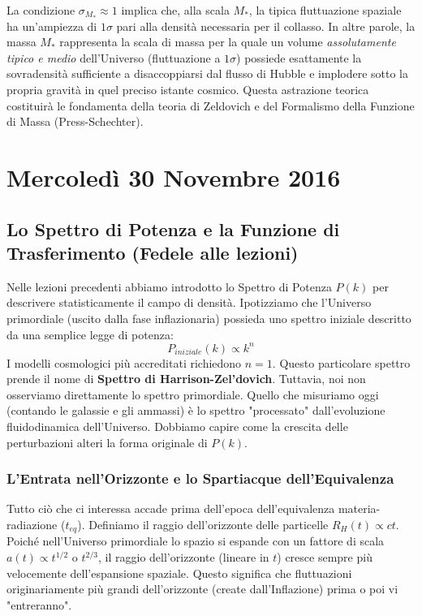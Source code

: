 \documentclass[11pt,a4paper]{report}
\begin{document}
La condizione $\sigma_{M_*} \approx 1$ implica che, alla scala $M_*$, la tipica fluttuazione spaziale ha un'ampiezza di $1 \sigma$ pari alla densità necessaria per il collasso. 
In altre parole, la massa $M_*$ rappresenta la scala di massa per la quale un volume \textit{assolutamente tipico e medio} dell'Universo (fluttuazione a $1 \sigma$) possiede esattamente la sovradensità sufficiente a disaccoppiarsi dal flusso di Hubble e implodere sotto la propria gravità in quel preciso istante cosmico. Questa astrazione teorica costituirà le fondamenta della teoria di Zeldovich e del Formalismo della Funzione di Massa (Press-Schechter).

\chapter{Mercoledì 30 Novembre 2016}

\section{Lo Spettro di Potenza e la Funzione di Trasferimento (Fedele alle lezioni)}

Nelle lezioni precedenti abbiamo introdotto lo Spettro di Potenza $P(k)$ per descrivere statisticamente il campo di densità. Ipotizziamo che l'Universo primordiale (uscito dalla fase inflazionaria) possieda uno spettro iniziale descritto da una semplice legge di potenza:
\begin{equation}
P_{iniziale}(k) \propto k^n
\end{equation}
I modelli cosmologici più accreditati richiedono $n=1$. Questo particolare spettro prende il nome di \textbf{Spettro di Harrison-Zel'dovich}. 
Tuttavia, noi non osserviamo direttamente lo spettro primordiale. Quello che misuriamo oggi (contando le galassie e gli ammassi) è lo spettro "processato" dall'evoluzione fluidodinamica dell'Universo. Dobbiamo capire come la crescita delle perturbazioni alteri la forma originale di $P(k)$.

\subsection{L'Entrata nell'Orizzonte e lo Spartiacque dell'Equivalenza}
Tutto ciò che ci interessa accade prima dell'epoca dell'equivalenza materia-radiazione ($t_{eq}$). 
Definiamo il raggio dell'orizzonte delle particelle $R_H(t) \propto ct$. Poiché nell'Universo primordiale lo spazio si espande con un fattore di scala $a(t) \propto t^{1/2}$ o $t^{2/3}$, il raggio dell'orizzonte (lineare in $t$) cresce sempre più velocemente dell'espansione spaziale. Questo significa che fluttuazioni originariamente più grandi dell'orizzonte (create dall'Inflazione) prima o poi vi "entreranno". 
\end{document}

